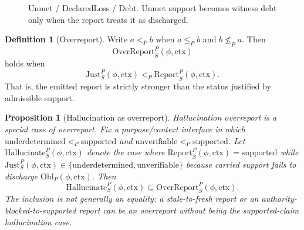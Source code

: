 \documentclass[11pt,twoside]{article}
\newtheorem{proposition}[theorem]{Proposition}
\theoremstyle{definition}
\newtheorem{definition}[theorem]{Definition}
\newcommand{\Obl}{\mathrm{Obl}}
\newcommand{\Carry}{\mathrm{Carry}}
\newcommand{\Just}{\mathrm{Just}}
\newcommand{\Report}{\mathrm{Report}}
\newcommand{\OverReport}{\mathrm{OverReport}}
\newcommand{\Hallucinate}{\mathrm{Hallucinate}}
\newcommand{\ctx}{\mathrm{ctx}}
\newcommand{\supported}{\mathrm{supported}}
\newcommand{\underdetermined}{\mathrm{underdetermined}}
\newcommand{\unverifiable}{\mathrm{unverifiable}}
\begin{document}
\begin{figure}[ht]
\centering
{}
\caption{Unmet / DeclaredLoss / Debt. Unmet support becomes witness debt only when the report treats it as discharged.}
\label{fig:witness-debt}
\end{figure}

\begin{definition}[Overreport]
Write $a <_P b$ when $a\leq_P b$ and $b\not\leq_P a$. Then
\[
  \OverReport_S^P(\phi,\ctx)
\]
holds when
\[
  \Just_S^P(\phi,\ctx) <_P \Report_S^P(\phi,\ctx).
\]
That is, the emitted report is strictly stronger than the status justified by
admissible support.
\end{definition}

\begin{proposition}[Hallucination as overreport]
\label{prop:hallucination-overreport}
Hallucination overreport is a special case of overreport. Fix a
purpose/context interface in which
$\underdetermined<_P\supported$ and
$\unverifiable<_P\supported$. Let
$\Hallucinate_S^P(\phi,\ctx)$ denote the case where
$\Report_S^P(\phi,\ctx)=\supported$ while
$\Just_S^P(\phi,\ctx)\in\{\underdetermined,\unverifiable\}$ because carried
support fails to discharge $\Obl_P(\phi,\ctx)$. Then
\[
  \Hallucinate_S^P(\phi,\ctx)
  \subseteq
  \OverReport_S^P(\phi,\ctx).
\]
The inclusion is not generally an equality: a stale-to-fresh report or an
authority-blocked-to-supported report can be an overreport without being the
supported-claim hallucination case.
\end{proposition}
\end{document}
